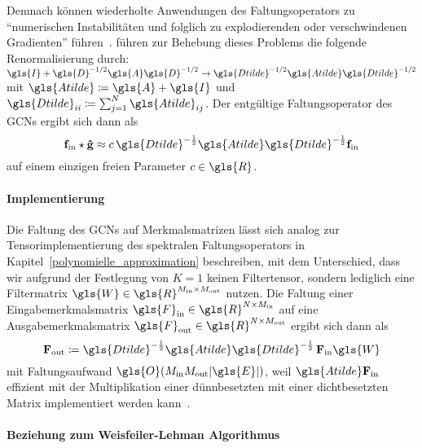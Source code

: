 Demnach können wiederholte Anwendungen des Faltungsoperators zu \enquote{numerischen Instabilitäten und folglich zu explodierenden oder verschwindenen Gradienten} führen~\cite{gcn}.
\citeauthor{gcn} führen zur Behebung dieses Problems die folgende Renormalisierung durch: $\gls{I} + \gls{D}^{-1/2} \gls{A} \gls{D}^{-1/2} \rightarrow \gls{Dtilde}^{-1/2} \gls{Atilde} \gls{Dtilde}^{-1/2}$ mit $\gls{Atilde} \coloneqq \gls{A} + \gls{I}$ und $\gls{Dtilde}_{ii} \coloneqq \sum_{j=1}^N \gls{Atilde}_{ij}$.
Der entgültige Faltungsoperator des \glspl{GCN} ergibt sich dann als
\begin{equation}
  \ve{f}_{\mathrm{in}} \star \ve{\hat g} \approx c\, \gls{Dtilde}^{-\frac{1}{2}} \gls{Atilde} \gls{Dtilde}^{-\frac{1}{2}} \ve{f}_{\mathrm{in}}
  \label{eq:gcn_renorm}
\end{equation}
auf einem einzigen freien Parameter $c \in \gls{R}$.

\paragraph{Implementierung}
\label{gcn_tensor}

Die Faltung des \glspl{GCN} auf Merkmalsmatrizen lässt sich analog zur Tensorimplementierung des spektralen Faltungsoperators in Kapitel~\ref{polynomielle_approximation} beschreiben, mit dem Unterschied, dass wir aufgrund der Festlegung von $K=1$ keinen Filtertensor, sondern lediglich eine Filtermatrix $\gls{W} \in \gls{R}^{M_{\mathrm{in}} \times M_{\mathrm{out}}}$ nutzen.
Die Faltung einer Eingabemerkmalsmatrix $\gls{F}_{\mathrm{in}} \in \gls{R}^{N \times M_{\mathrm{in}}}$ auf eine Ausgabemerkmalsmatrix $\gls{F}_{\mathrm{out}} \in \gls{R}^{N \times M_{\mathrm{out}}}$ ergibt sich dann als
\begin{equation}
  \ma{F}_{\mathrm{out}} \coloneqq \gls{Dtilde}^{-\frac{1}{2}} \gls{Atilde} \gls{Dtilde}^{-\frac{1}{2}}\, \ma{F}_{\mathrm{in}} \gls{W}
  \label{eq:gcn_tensor}
\end{equation}
mit Faltungsaufwand $\gls{O}\left(M_{\mathrm{in}}M_{\mathrm{out}}\left|\gls{E}\right|\right)$, weil $\gls{Atilde}\ma{F}_{\mathrm{in}}$ effizient mit der Multiplikation einer dünnbesetzten mit einer dichtbesetzten Matrix implementiert werden kann~\cite{gcn}.

\paragraph{Beziehung zum Weisfeiler-Lehman Algorithmus}
\label{weisfeiler_lehman_beziehung}

